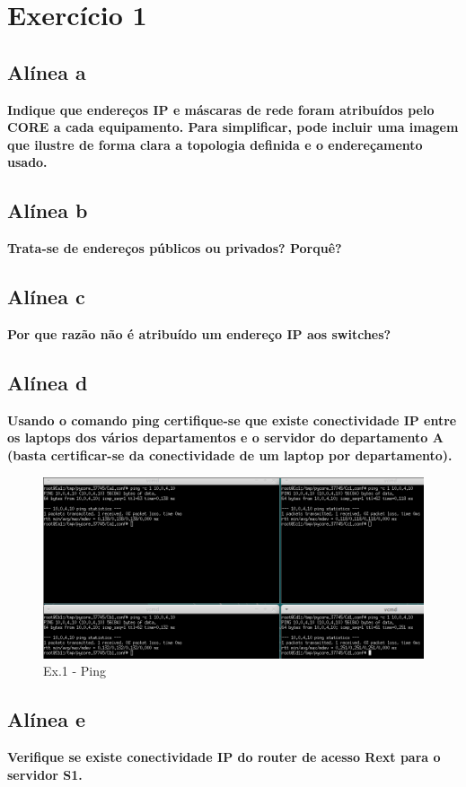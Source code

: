 \documentclass[a4paper]{report}
\begin{document}
\section{Exercício 1}

\subsection{Alínea a}
\textbf{Indique que endereços IP e máscaras de rede foram atribuídos pelo CORE a cada
equipamento. Para simplificar, pode incluir uma imagem que ilustre de forma clara a
topologia definida e o endereçamento usado.}

\subsection{Alínea b}
\textbf{Trata-se de endereços públicos ou privados? Porquê?}

\subsection{Alínea c}
\textbf{Por que razão não é atribuído um endereço IP aos switches?}

\subsection{Alínea d}
\textbf{Usando o comando ping certifique-se que existe conectividade IP entre 
os laptops dos vários departamentos e o servidor do departamento A 
(basta certificar-se da conectividade de um laptop por departamento).}

\begin{figure}[H]
    \centering 
    \includegraphics[width=\textwidth]{images/pingEx1P2.png}
    \caption{Ex.1 - Ping}
    \label{fig:pingEx1P2}
\end{figure}

\subsection{Alínea e}
\textbf{Verifique se existe conectividade IP do router de acesso Rext para o servidor S1.}
\end{document}
